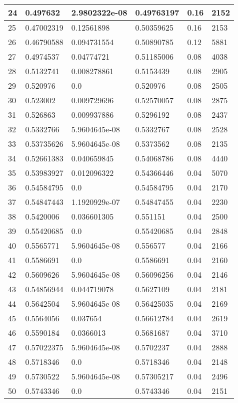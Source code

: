 \begin{longtable}{|l|l|l|l|l|l|}
24 & 0.497632 & 2.9802322e-08 & 0.49763197 & 0.16 & 2152 \\ \hline 
25 & 0.47002319 & 0.12561898 & 0.50359625 & 0.16 & 2153 \\ \hline 
26 & 0.46790588 & 0.094731554 & 0.50890785 & 0.12 & 5881 \\ \hline 
27 & 0.4974537 & 0.04774721 & 0.51185006 & 0.08 & 4038 \\ \hline 
28 & 0.5132741 & 0.008278861 & 0.5153439 & 0.08 & 2905 \\ \hline 
29 & 0.520976 & 0.0 & 0.520976 & 0.08 & 2505 \\ \hline 
30 & 0.523002 & 0.009729696 & 0.52570057 & 0.08 & 2875 \\ \hline 
31 & 0.526863 & 0.009937886 & 0.5296192 & 0.08 & 2437 \\ \hline 
32 & 0.5332766 & 5.9604645e-08 & 0.5332767 & 0.08 & 2528 \\ \hline 
33 & 0.53735626 & 5.9604645e-08 & 0.5373562 & 0.08 & 2135 \\ \hline 
34 & 0.52661383 & 0.040659845 & 0.54068786 & 0.08 & 4440 \\ \hline 
35 & 0.53983927 & 0.012096322 & 0.54366446 & 0.04 & 5070 \\ \hline 
36 & 0.54584795 & 0.0 & 0.54584795 & 0.04 & 2170 \\ \hline 
37 & 0.54847443 & 1.1920929e-07 & 0.54847455 & 0.04 & 2230 \\ \hline 
38 & 0.5420006 & 0.036601305 & 0.551151 & 0.04 & 2500 \\ \hline 
39 & 0.55420685 & 0.0 & 0.55420685 & 0.04 & 2848 \\ \hline 
40 & 0.5565771 & 5.9604645e-08 & 0.556577 & 0.04 & 2166 \\ \hline 
41 & 0.5586691 & 0.0 & 0.5586691 & 0.04 & 2160 \\ \hline 
42 & 0.5609626 & 5.9604645e-08 & 0.56096256 & 0.04 & 2146 \\ \hline 
43 & 0.54856944 & 0.044719078 & 0.5627109 & 0.04 & 2181 \\ \hline 
44 & 0.5642504 & 5.9604645e-08 & 0.56425035 & 0.04 & 2169 \\ \hline 
45 & 0.5564056 & 0.037654 & 0.56612784 & 0.04 & 2619 \\ \hline 
46 & 0.5590184 & 0.0366013 & 0.5681687 & 0.04 & 3710 \\ \hline 
47 & 0.57022375 & 5.9604645e-08 & 0.5702237 & 0.04 & 2888 \\ \hline 
48 & 0.5718346 & 0.0 & 0.5718346 & 0.04 & 2148 \\ \hline 
49 & 0.5730522 & 5.9604645e-08 & 0.57305217 & 0.04 & 2496 \\ \hline 
50 & 0.5743346 & 0.0 & 0.5743346 & 0.04 & 2151 \\ \hline 
\end{longtable}